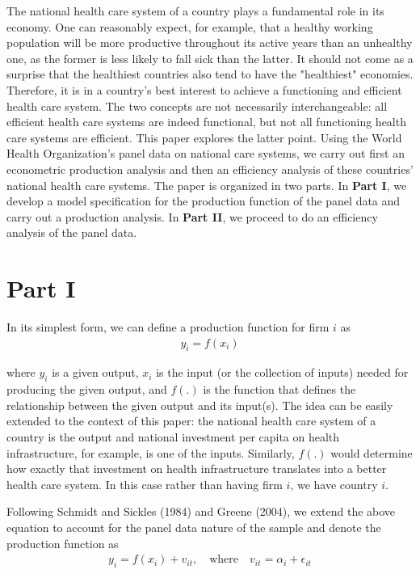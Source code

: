 \documentclass[12pt,a4paper]{article}\usepackage[]{graphicx}\usepackage[]{color}
\begin{document}
The national health care system of a country plays a fundamental role in its economy. One can reasonably expect, for example, that a healthy working population will be more productive throughout its active years than an unhealthy one, as the former is less likely to fall sick than the latter. It should not come as a surprise that the healthiest countries also tend to have the "healthiest" economies. Therefore, it is in a country's best interest to achieve a functioning and efficient health care system. The two concepts are not necessarily interchangeable: all efficient health care systems are indeed functional, but not all functioning health care systems are efficient. This paper explores the latter point. 
Using the World Health Organization's panel data on national care systems, we carry out first an econometric production analysis and then an efficiency analysis of these countries' national health care systems. The paper is organized in two parts. In \textbf{Part I}, we develop a model specification for the production function of the panel data and carry out a production analysis. In \textbf{Part II}, we proceed to do an efficiency analysis of the panel data.

\section*{Part I}

In its simplest form, we can define a production function for firm $i$ as
$$
\begin{aligned}
y_i = f(x_i)
\end{aligned}
$$

where $y_i$ is a given output, $x_i$ is the input (or the collection of inputs) needed for producing the given output, and $f(.)$ is the function that defines the relationship between the given output and its input(s). The idea can be easily extended to the context of this paper: the national health care system of a country is the output and national investment per capita on health infrastructure, for example, is one of the inputs. Similarly, $f(.)$ would determine how exactly that investment on health infrastructure translates into a better health care system. In this case rather than having firm $i$, we have country $i$.

Following Schmidt and Sickles (1984) and Greene (2004), we extend the above equation to account for the panel data nature of the sample and denote the production function as
$$
\begin{aligned}
y_i = f(x_i) + v_{it}, \quad \textrm{where} \quad v_{it} = \alpha_i + \epsilon_{it}
\end{aligned}
$$
\end{document}
